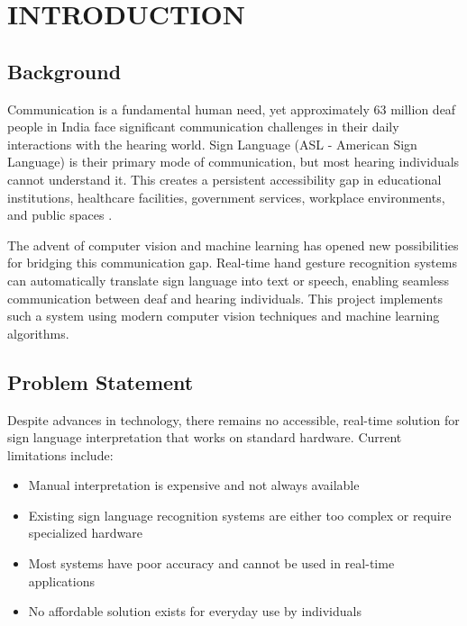 \chapter{INTRODUCTION} \label{c1}
\justifying

\section{Background}

Communication is a fundamental human need, yet approximately 63 million deaf people in India face significant communication challenges in their daily interactions with the hearing world. Sign Language (ASL - American Sign Language) is their primary mode of communication, but most hearing individuals cannot understand it. This creates a persistent accessibility gap in educational institutions, healthcare facilities, government services, workplace environments, and public spaces \cite{kumar2020sign}.

The advent of computer vision and machine learning has opened new possibilities for bridging this communication gap. Real-time hand gesture recognition systems can automatically translate sign language into text or speech, enabling seamless communication between deaf and hearing individuals. This project implements such a system using modern computer vision techniques and machine learning algorithms.

\vspace{1em}
\section{Problem Statement}

Despite advances in technology, there remains no accessible, real-time solution for sign language interpretation that works on standard hardware. Current limitations include:

\begin{itemize}
    \item Manual interpretation is expensive and not always available
    \item Existing sign language recognition systems are either too complex or require specialized hardware
    \item Most systems have poor accuracy and cannot be used in real-time applications
    \item No affordable solution exists for everyday use by individuals
\end{itemize}


